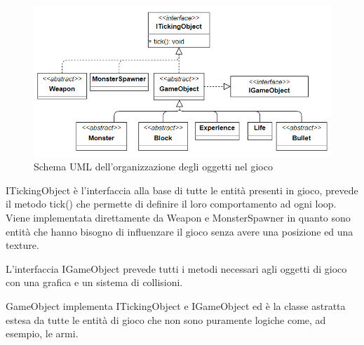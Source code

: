 \documentclass[a4paper,12pt]{report}
\begin{document}
\begin{figure}[H]
	\centering{}
	\includegraphics[width=\textwidth]{img/tickingObjectTree.png}
	\caption{Schema UML dell'organizzazione degli oggetti nel gioco}
	\label{img:tickingObjectTree}
\end{figure}

ITickingObject è l'interfaccia alla base di tutte le entità presenti in gioco, prevede il metodo tick() che permette di definire il loro comportamento ad ogni loop. Viene implementata direttamente da Weapon e MonsterSpawner in quanto sono entità che hanno bisogno di influenzare il gioco senza avere una posizione ed una texture. 

L'interfaccia IGameObject prevede tutti i metodi necessari agli oggetti di gioco con una grafica e un sistema di collisioni. 

GameObject implementa ITickingObject e IGameObject ed è la classe astratta estesa da tutte le entità di gioco che non sono puramente logiche come, ad esempio, le armi.
\end{document}
